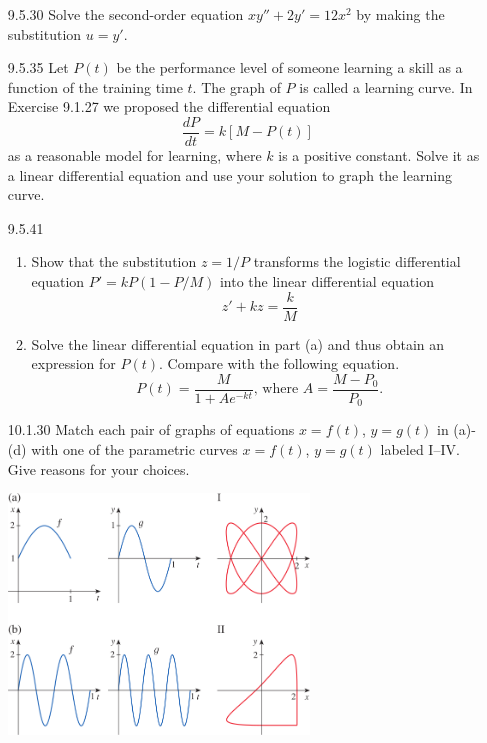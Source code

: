 \documentclass{article}
\begin{document}
\begin{enumerate}
\item[9.5.30]
    Solve the second-order equation $xy'' + 2y' = 12x^2$ by making the substitution $u=y'$.

    \vspace{5cm}

\item[9.5.35]
    Let $P(t)$ be the performance level of someone learning a skill as a function
    of the training time $t$. The graph of $P$ is called a learning curve.
    In Exercise 9.1.27 we proposed the differential equation
    \[\frac{dP}{dt} = k[M - P(t)]\]
    as a reasonable model for learning, where $k$ is a positive constant.
    Solve it as a linear differential equation and use your solution to graph the learning curve.

    \vspace{5cm}

\item[9.5.41]
    \begin{enumerate}
        \item Show that the substitution $z = 1/P$ transforms the logistic differential
            equation $P' = kP(1 - P/M)$ into the linear differential equation \[ z' + kz = \frac{k}{M}\]
        \item Solve the linear differential equation in part (a) and thus obtain
            an expression for $P(t)$. Compare with the following equation.
            \[
                P(t) = \frac{M}{1+A e^{-kt}} \text{, where }
                A = \frac{M - P_0}{P_0}.
            \]
    \end{enumerate}

    \newpage

\item[10.1.30]
    Match each pair of graphs of equations $x=f(t)$, $y=g(t)$ in (a)-(d) with one of
    the parametric curves $x=f(t)$, $y=g(t)$ labeled I–IV. Give reasons for your choices.

    \begin{center}
        \includegraphics[width=8cm]{./png/10.1.30.png}
    \end{center}


\end{enumerate}
\end{document}
